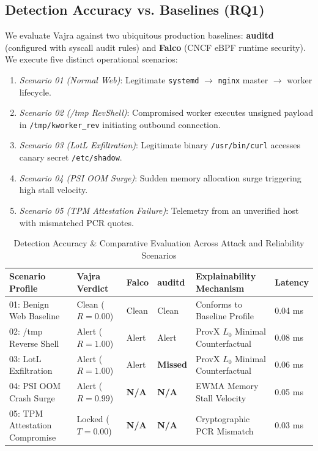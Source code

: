 \documentclass[conference]{IEEEtran}
\begin{document}
\subsection{Detection Accuracy vs. Baselines (RQ1)}
We evaluate Vajra against two ubiquitous production baselines: \textbf{auditd} (configured with syscall audit rules) and \textbf{Falco} (CNCF eBPF runtime security). We execute five distinct operational scenarios:
\begin{enumerate}
    \item \textit{Scenario 01 (Normal Web)}: Legitimate \texttt{systemd} $\to$ \texttt{nginx} master $\to$ worker lifecycle.
    \item \textit{Scenario 02 (/tmp RevShell)}: Compromised worker executes unsigned payload in \texttt{/tmp/kworker\_rev} initiating outbound connection.
    \item \textit{Scenario 03 (LotL Exfiltration)}: Legitimate binary \texttt{/usr/bin/curl} accesses canary secret \texttt{/etc/shadow}.
    \item \textit{Scenario 04 (PSI OOM Surge)}: Sudden memory allocation surge triggering high stall velocity.
    \item \textit{Scenario 05 (TPM Attestation Failure)}: Telemetry from an unverified host with mismatched PCR quotes.
\end{enumerate}

\begin{table}[t]
\centering
\caption{Detection Accuracy \& Comparative Evaluation Across Attack and Reliability Scenarios}
\label{tab:detection}
\begin{tabular}{@{}llllll@{}}
\toprule
\textbf{Scenario Profile} & \textbf{Vajra Verdict} & \textbf{Falco} & \textbf{auditd} & \textbf{Explainability Mechanism} & \textbf{Latency} \\ \midrule
01: Benign Web Baseline & Clean ($R = 0.00$) & Clean & Clean & Conforms to Baseline Profile & 0.04 ms \\
02: /tmp Reverse Shell & Alert ($R = 1.00$) & Alert & Alert & ProvX $L_0$ Minimal Counterfactual & 0.08 ms \\
03: LotL Exfiltration & Alert ($R = 1.00$) & Alert & \textbf{Missed} & ProvX $L_0$ Minimal Counterfactual & 0.06 ms \\
04: PSI OOM Crash Surge & Alert ($R = 0.99$) & \textbf{N/A} & \textbf{N/A} & EWMA Memory Stall Velocity & 0.05 ms \\
05: TPM Attestation Compromise & Locked ($T = 0.00$) & \textbf{N/A} & \textbf{N/A} & Cryptographic PCR Mismatch & 0.03 ms \\ \bottomrule
\end{tabular}
\end{table}
\end{document}
